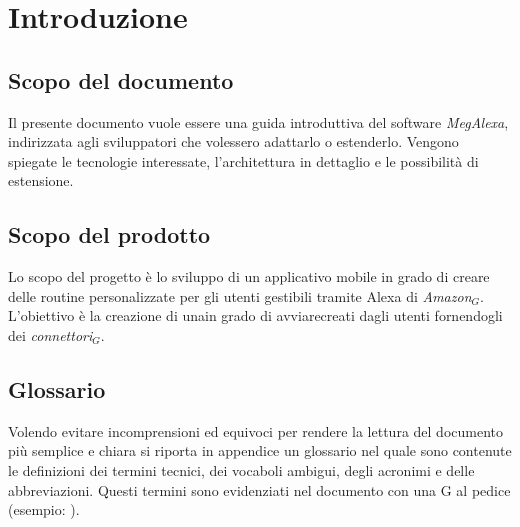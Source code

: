\chapter{Introduzione}
\label{Introduzione}
\section{Scopo del documento}
Il presente documento vuole essere una guida introduttiva del software \textit{MegAlexa}, indirizzata agli sviluppatori che volessero adattarlo o estenderlo. Vengono spiegate le tecnologie interessate, l'architettura in dettaglio e le possibilità di estensione. 

\section{Scopo del prodotto}
Lo scopo del progetto è lo sviluppo di un applicativo mobile in grado di creare delle routine personalizzate per gli utenti 
gestibili tramite Alexa di \textit{Amazon$_{G}$}. L’obiettivo è la creazione di unain grado di avviarecreati dagli utenti fornendogli dei \textit{connettori$_{G}$}.

\section{Glossario}
Volendo evitare incomprensioni ed equivoci per rendere la lettura del documento più semplice
e chiara si riporta in appendice un glossario nel quale sono contenute le definizioni dei
termini tecnici, dei vocaboli ambigui, degli acronimi e delle abbreviazioni. Questi termini
sono evidenziati nel documento con una G al pedice (esempio: ).


